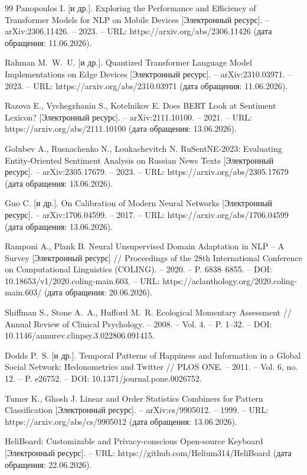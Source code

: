 \documentclass[12pt,a4paper]{report}
\providecommand{\url}[1]{#1}
\begin{document}
\begin{thebibliography}{99}
Panopoulos I. [и др.]. Exploring the Performance and Efficiency of Transformer Models for NLP on Mobile Devices [Электронный ресурс]. -- arXiv:2306.11426. -- 2023. -- URL: \url{https://arxiv.org/abs/2306.11426} (дата обращения: 11.06.2026).

Rahman M.~W.~U. [и др.]. Quantized Transformer Language Model Implementations on Edge Devices [Электронный ресурс]. -- arXiv:2310.03971. -- 2023. -- URL: \url{https://arxiv.org/abs/2310.03971} (дата обращения: 11.06.2026).

Razova E., Vychegzhanin S., Kotelnikov E. Does BERT Look at Sentiment Lexicon? [Электронный ресурс]. -- arXiv:2111.10100. -- 2021. -- URL: \url{https://arxiv.org/abs/2111.10100} (дата обращения: 13.06.2026).

Golubev A., Rusnachenko N., Loukachevitch N. RuSentNE-2023: Evaluating Entity-Oriented Sentiment Analysis on Russian News Texts [Электронный ресурс]. -- arXiv:2305.17679. -- 2023. -- URL: \url{https://arxiv.org/abs/2305.17679} (дата обращения: 13.06.2026).

Guo C. [и др.]. On Calibration of Modern Neural Networks [Электронный ресурс]. -- arXiv:1706.04599. -- 2017. -- URL: \url{https://arxiv.org/abs/1706.04599} (дата обращения: 13.06.2026).

Ramponi A., Plank B. Neural Unsupervised Domain Adaptation in NLP -- A Survey [Электронный ресурс] // Proceedings of the 28th International Conference on Computational Linguistics (COLING). -- 2020. -- P. 6838--6855. -- DOI: 10.18653/v1/2020.coling-main.603. -- URL: \url{https://aclanthology.org/2020.coling-main.603/} (дата обращения: 20.06.2026).

Shiffman S., Stone A.~A., Hufford M.~R. Ecological Momentary Assessment // Annual Review of Clinical Psychology. -- 2008. -- Vol. 4. -- P. 1--32. -- DOI: 10.1146/annurev.clinpsy.3.022806.091415.

Dodds P.~S. [и др.]. Temporal Patterns of Happiness and Information in a Global Social Network: Hedonometrics and Twitter // PLOS ONE. -- 2011. -- Vol. 6, no. 12. -- P. e26752. -- DOI: 10.1371/journal.pone.0026752.

Tumer K., Ghosh J. Linear and Order Statistics Combiners for Pattern Classification [Электронный ресурс]. -- arXiv:cs/9905012. -- 1999. -- URL: \url{https://arxiv.org/abs/cs/9905012} (дата обращения: 13.06.2026).

HeliBoard: Customizable and Privacy-conscious Open-source Keyboard [Электронный ресурс]. -- URL: \url{https://github.com/Helium314/HeliBoard} (дата обращения: 22.06.2026).

\end{thebibliography}
\end{document}
